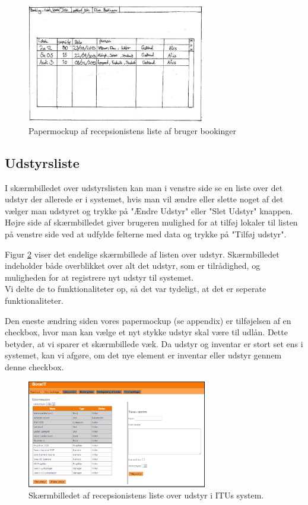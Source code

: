 \begin{figure}[h!]
  \centering
    \includegraphics[width=0.7\textwidth]{Appendix/GUI-Prototype/PaperMockup/GodkendBookinger_001}
  \caption{Papermockup af recepsionistens liste af bruger bookinger}
\label{Design_G_Development_BookingListe}
\end{figure} 

\subsection{Udstyrsliste}
I skærmbilledet over udstyrslisten kan man i venstre side se en liste over det udstyr der allerede er i systemet, hvis man vil ændre eller slette noget af det vælger man udstyret og trykke på "Ændre Udstyr" eller "Slet Udstyr" knappen. Højre side af skærmbilledet giver brugeren mulighed for at tilføj lokaler til listen på venstre side ved at udfylde felterne med data og trykke på "Tilføj udstyr".

Figur \ref{Design_G_Development_UdstyrsListe_Final} viser det endelige skærmbillede af listen over udstyr.
Skærmbilledet indeholder både overblikket over alt det udstyr, som er tilrådighed, og muligheden for at registrere nyt udstyr til systemet.
\\Vi delte de to funktionaliteter op, så det var tydeligt, at det er seperate funktionaliteter.

Den eneste ændring siden vores papermockup (se appendix) er tilføjelsen af en checkbox, hvor man kan vælge et nyt stykke udstyr skal være til udlån. Dette betyder, at vi sparer et skærmbillede væk. Da udstyr og inventar er stort set ens i systemet, kan vi afgøre, om det nye element er inventar eller udstyr gennem denne checkbox.

\begin{figure}[h!]
  \centering
    \includegraphics[width=0.7\textwidth]{Appendix/GUI-Prototype/DigitalMockup/UdstyrsListe}
  \caption{Skærmbilledet af recepsionistens liste over udstyr i ITUs system.}
\label{Design_G_Development_UdstyrsListe_Final}
\end{figure} 

